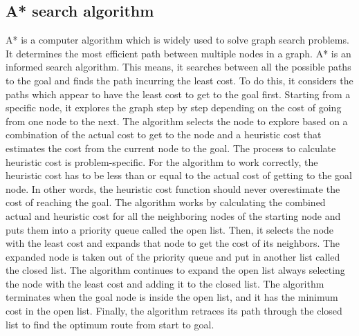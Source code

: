 
\subsection{A* search algorithm}
A* is a computer algorithm which is widely used to solve graph search problems. It determines the most efficient path between multiple nodes in a graph. A* is an informed search algorithm. This means, it searches between all the possible paths to the goal and finds the path incurring the least cost. To do this, it considers the paths which appear to have the least cost to get to the goal first. Starting from a specific node, it explores the graph step by step depending on the cost of going from one node to the next. The algorithm selects the node to explore based on a combination of the actual cost to get to the node and a heuristic cost that estimates the cost from the current node to the goal. The process to calculate heuristic cost is problem-specific. For the algorithm to work correctly, the heuristic cost has to be less than or equal to the actual cost of getting to the goal node. In other words, the heuristic cost function should never overestimate the cost of reaching the goal. The algorithm works by calculating the combined actual and heuristic cost for all the neighboring nodes of the starting node and puts them into a priority queue called the open list. Then, it selects the node with the least cost and expands that node to get the cost of its neighbors. The expanded node is taken out of the priority queue and put in another list called the closed list. The algorithm continues to expand the open list always selecting the node with the least cost and adding it to the closed list. The algorithm terminates when the goal node is inside the open list, and it has the minimum cost in the open list. Finally, the algorithm retraces its path through the closed list to find the optimum route from start to goal. \cite{a8book} 



